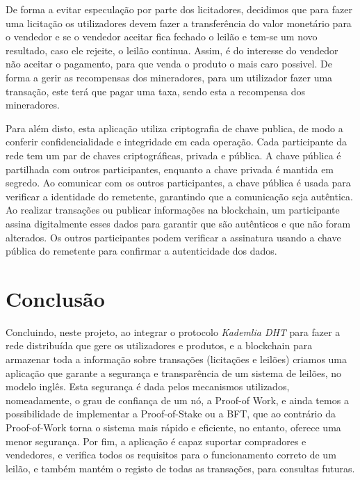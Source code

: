 \documentclass[conference]{IEEEtran}
\begin{document}
    De forma a evitar especulação por parte dos licitadores, decidimos que para fazer uma licitação os utilizadores devem fazer a transferência do valor monetário para o vendedor e se o vendedor aceitar fica fechado o leilão e tem-se um novo resultado, caso ele rejeite, o leilão continua. Assim, é do interesse do vendedor não aceitar o pagamento, para que venda o produto o mais caro possivel. De forma a gerir as recompensas dos mineradores, para um utilizador fazer uma transação, este terá que pagar uma taxa, sendo esta a recompensa dos mineradores.

    Para além disto, esta aplicação utiliza criptografia de chave publica, de modo a conferir confidencialidade e integridade em cada operação. Cada participante da rede tem um par de chaves criptográficas, privada e pública. A chave pública é partilhada com outros participantes, enquanto a chave privada é mantida em segredo. Ao comunicar com os outros participantes, a chave pública é usada para verificar a identidade do remetente, garantindo que a comunicação seja autêntica. Ao realizar transações ou publicar informações na blockchain, um participante assina digitalmente esses dados para garantir que são autênticos e que não foram alterados. Os outros participantes podem verificar a assinatura usando a chave pública do remetente para confirmar a autenticidade dos dados.\\


    \section{Conclusão}
    Concluindo, neste projeto, ao integrar o protocolo \textit{Kademlia DHT} para fazer a rede distribuída que gere os utilizadores e produtos, e a blockchain para armazenar toda a informação sobre transações (licitações e leilões) criamos uma aplicação que garante a segurança e transparência de um sistema de leilões, no modelo inglês. Esta segurança é dada pelos mecanismos utilizados, nomeadamente, o grau de confiança de um nó, a Proof-of Work, e ainda temos a possibilidade de implementar a Proof-of-Stake ou a BFT, que ao contrário da Proof-of-Work torna o sistema mais rápido e eficiente, no entanto, oferece uma menor segurança.
    Por fim, a aplicação é capaz suportar compradores e vendedores, e verifica todos os requisitos para o funcionamento correto de um leilão, e também mantém o registo de todas as transações, para consultas futuras.\\
\end{document}
